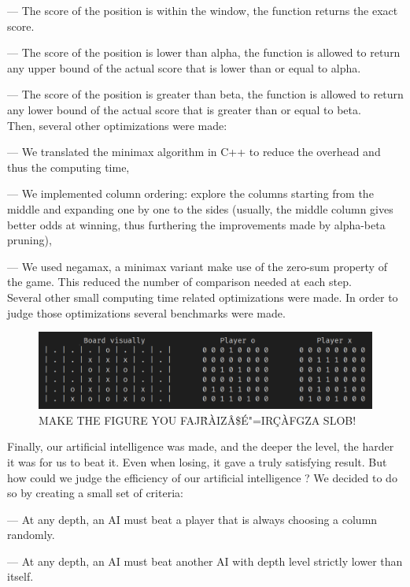 \documentclass[12pt, a4paper, oneside]{report}
\begin{document}
	— The score of the position is within the window, the function returns the exact score.
	
	— The score of the position is lower than alpha, the function is allowed to return any upper bound of the actual score that is lower than or equal to alpha.

	— The score of the position is greater than beta, the function is allowed to return any lower bound of the actual score that is greater than or equal to beta. \\
	Then, several other optimizations were made:
	
	— We translated the minimax algorithm in C++ to reduce the overhead and thus the computing time,

	— We implemented column ordering: explore the columns starting from the middle and expanding one by one to the sides (usually, the middle column gives better odds at winning, thus furthering the improvements made by alpha-beta pruning),

	— We used negamax, a minimax variant make use of the zero-sum property of the game. This reduced the number of comparison needed at each step. \\

	Several other small computing time related optimizations were made. In order to judge those optimizations several benchmarks were made.
	\begin{figure}[h]
		\includegraphics[scale=0.4]{example.png}
		\centering
		\caption{MAKE THE FIGURE YOU FAJ\^RÀIZÂ\$É"=IRÇÀFGZA SLOB!}\label{fig:ai_benchmarks}
	\end{figure}

	Finally, our artificial intelligence was made, and the deeper the level, the harder it was for us to beat it. Even when losing, it gave a truly satisfying result. But how could we judge the efficiency of our artificial intelligence ? We decided to do so by creating a small set of criteria:

	— At any depth, an AI must beat a player that is always choosing a column randomly.

	— At any depth, an AI must beat another AI with depth level strictly lower than itself.
\end{document}
